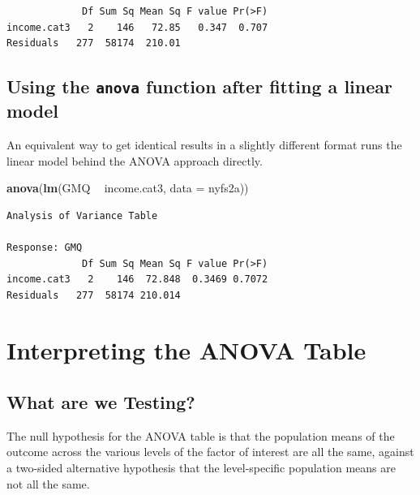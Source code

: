 \documentclass[
]{book}
\newenvironment{Shaded}{\begin{snugshade}}{\end{snugshade}}
\newcommand{\DataTypeTok}[1]{\textcolor[rgb]{0.13,0.29,0.53}{#1}}
\newcommand{\KeywordTok}[1]{\textcolor[rgb]{0.13,0.29,0.53}{\textbf{#1}}}
\newcommand{\NormalTok}[1]{#1}
\newcommand{\OperatorTok}[1]{\textcolor[rgb]{0.81,0.36,0.00}{\textbf{#1}}}
\newcommand{\StringTok}[1]{\textcolor[rgb]{0.31,0.60,0.02}{#1}}
\begin{document}
\begin{verbatim}
             Df Sum Sq Mean Sq F value Pr(>F)
income.cat3   2    146   72.85   0.347  0.707
Residuals   277  58174  210.01               
\end{verbatim}

\hypertarget{using-the-anova-function-after-fitting-a-linear-model}{%
\subsection{\texorpdfstring{Using the \texttt{anova} function after fitting a linear model}{Using the anova function after fitting a linear model}}\label{using-the-anova-function-after-fitting-a-linear-model}}

An equivalent way to get identical results in a slightly different format runs the linear model behind the ANOVA approach directly.

\begin{Shaded}
\begin{Highlighting}[]
\KeywordTok{anova}\NormalTok{(}\KeywordTok{lm}\NormalTok{(GMQ }\OperatorTok{~}\StringTok{ }\NormalTok{income.cat3, }\DataTypeTok{data =}\NormalTok{ nyfs2a))}
\end{Highlighting}
\end{Shaded}

\begin{verbatim}
Analysis of Variance Table

Response: GMQ
             Df Sum Sq Mean Sq F value Pr(>F)
income.cat3   2    146  72.848  0.3469 0.7072
Residuals   277  58174 210.014               
\end{verbatim}

\hypertarget{interpreting-the-anova-table}{%
\section{Interpreting the ANOVA Table}\label{interpreting-the-anova-table}}

\hypertarget{what-are-we-testing}{%
\subsection{What are we Testing?}\label{what-are-we-testing}}

The null hypothesis for the ANOVA table is that the population means of the outcome across the various levels of the factor of interest are all the same, against a two-sided alternative hypothesis that the level-specific population means are not all the same.
\end{document}
